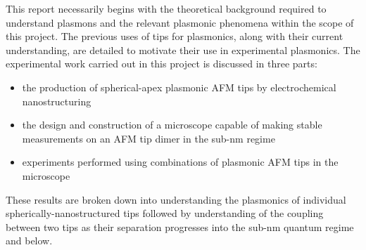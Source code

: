 \documentclass[12pt, a4paper, twoside]{book}
\begin{document}
This report necessarily begins with the theoretical background required to understand plasmons and the relevant plasmonic phenomena within the scope of this project. The previous uses of tips for plasmonics, along with their current understanding, are detailed to motivate their use in experimental plasmonics.
The experimental work carried out in this project is discussed in three parts:
\begin{itemize}
\item the production of spherical-apex plasmonic AFM tips by electrochemical nanostructuring
\item the design and construction of a microscope capable of making stable measurements on an AFM tip dimer in the sub-nm regime
\item experiments performed using combinations of plasmonic AFM tips in the microscope
\end{itemize}
These results are broken down into understanding the plasmonics of individual spherically-nanostructured tips followed by understanding of the coupling between two tips as their separation progresses into the sub-nm quantum regime and below.

\ifstandalone
\begin{singlespace}
\fontsize{8pt}{1em}\selectfont
\printbibliography[notcategory=fullcited]
\end{singlespace}
\fi
\end{document}
